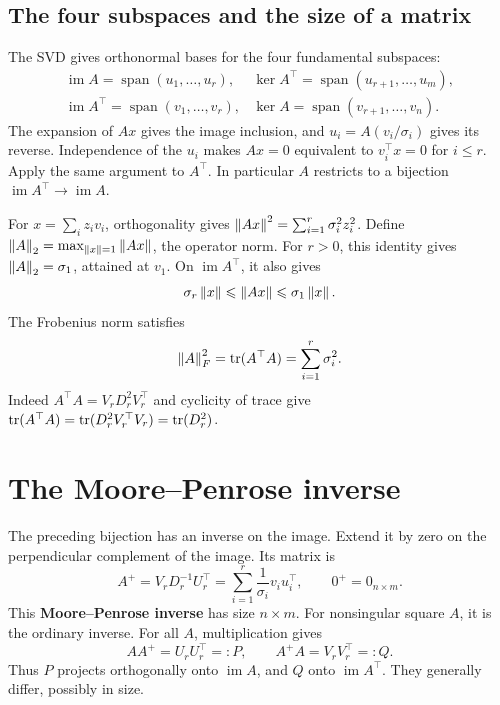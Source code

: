 \subsection*{The four subspaces and the size of a matrix}
The SVD gives orthonormal bases for the four fundamental subspaces:
\[
\begin{array}{ll}
\operatorname{im}A=\operatorname{span}(u_1,\ldots,u_r),&
\ker A^\top=\operatorname{span}(u_{r+1},\ldots,u_m),\\
\operatorname{im}A^\top=\operatorname{span}(v_1,\ldots,v_r),&
\ker A=\operatorname{span}(v_{r+1},\ldots,v_n).
\end{array}
\]
The expansion of \(Ax\) gives the image inclusion, and
\(u_i=A(v_i/\sigma_i)\) gives its reverse. Independence of the \(u_i\)
makes \(Ax=0\) equivalent to \(v_i^\top x=0\) for \(i\leqslant r\).
Apply the same argument to \(A^\top\). In particular \(A\) restricts to
a bijection \(\operatorname{im}A^\top\to\operatorname{im}A\).

For \(x=\sum_i z_i v_i\), orthogonality gives
\(\left\lVert Ax\right\rVert^2=\sum_{i=1}^r\sigma_i^2z_i^2\).
Define \(\left\lVert A\right\rVert_2=\max_{\left\lVert x\right\rVert=1}\left\lVert Ax\right\rVert\), the operator norm.
For \(r>0\), this identity gives \(\left\lVert A\right\rVert_2=\sigma_1\), attained at
\(v_1\). On \(\operatorname{im}A^\top\), it also gives
\[
\sigma_r\left\lVert x\right\rVert\leqslant\left\lVert Ax\right\rVert\leqslant\sigma_1\left\lVert x\right\rVert.
\]
The Frobenius norm satisfies
\[
\left\lVert A\right\rVert_F^2=\operatorname{tr}(A^\top A)=\sum_{i=1}^r\sigma_i^2.
\]
Indeed \(A^\top A=V_rD_r^2V_r^\top\) and cyclicity of trace give
\(\operatorname{tr}(A^\top A)=\operatorname{tr}(D_r^2V_r^\top V_r)=\operatorname{tr}(D_r^2)\).

\section*{The Moore--Penrose inverse}
The preceding bijection has an inverse on the image. Extend it by zero
on the perpendicular complement of the image. Its matrix is
\[
A^+=V_rD_r^{-1}U_r^\top
=\sum_{i=1}^r\frac1{\sigma_i}v_i u_i^\top,
\qquad 0^+=0_{n\times m}.
\]
This \textbf{Moore--Penrose inverse} has size \(n\times m\).
For nonsingular square \(A\), it is the ordinary inverse.
For all \(A\), multiplication gives
\[
AA^+=U_rU_r^\top=:P,\qquad A^+A=V_rV_r^\top=:Q.
\]
Thus \(P\) projects orthogonally onto \(\operatorname{im}A\), and \(Q\)
onto \(\operatorname{im}A^\top\). They generally differ, possibly in size.

